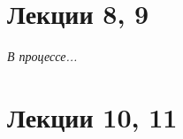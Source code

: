 


    
    \newpage
    \hypertarget{intro}{}
    \tableofcontents
    \newpage
    
    
    
    
    
    
    

    

    

    
        
    
    
    \section{Лекции 8, 9}
    \textit{В процессе...}
    
    \section{Лекции 10, 11}
    
    
    
    
    
    
